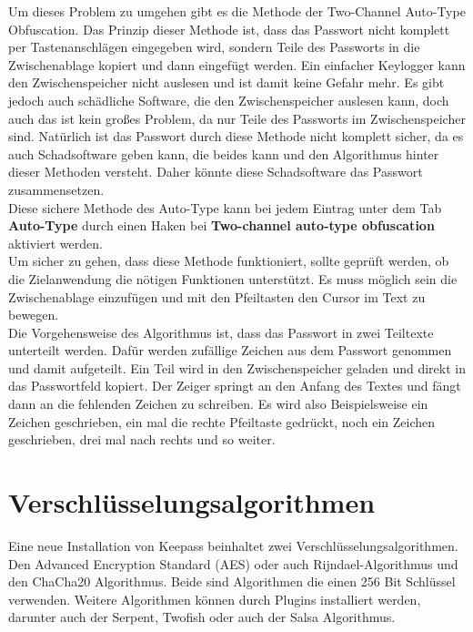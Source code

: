 \documentclass[12pt,a4paper]{scrreprt}
\begin{document}
\noindent Um dieses Problem zu umgehen gibt es die Methode der Two-Channel Auto-Type Obfuscation. Das Prinzip dieser Methode ist, dass das Passwort nicht komplett per Tastenanschlägen eingegeben wird, sondern Teile des Passworts in die Zwischenablage kopiert und dann eingefügt werden. Ein einfacher Keylogger kann den Zwischenspeicher nicht auslesen und ist damit keine Gefahr mehr. Es gibt jedoch auch schädliche Software, die den Zwischenspeicher auslesen kann, doch auch das ist kein großes Problem, da nur Teile des Passworts im Zwischenspeicher sind. Natürlich ist das Passwort durch diese Methode nicht komplett sicher, da es auch Schadsoftware geben kann, die beides kann und den Algorithmus hinter dieser Methoden versteht. Daher könnte diese Schadsoftware das Passwort zusammensetzen.\\

\noindent Diese sichere Methode des Auto-Type kann bei jedem Eintrag unter dem Tab \textbf{Auto-Type} durch einen Haken bei \textbf{Two-channel auto-type obfuscation} aktiviert werden.\\

\noindent Um sicher zu gehen, dass diese Methode funktioniert, sollte geprüft werden, ob die Zielanwendung die nötigen Funktionen unterstützt. Es muss möglich sein die Zwischenablage einzufügen und mit den Pfeiltasten den Cursor im Text zu bewegen.\\

\noindent Die Vorgehensweise des Algorithmus ist, dass das Passwort in zwei Teiltexte unterteilt werden. Dafür werden zufällige Zeichen aus dem Passwort genommen und damit aufgeteilt. Ein Teil wird in den Zwischenspeicher geladen und direkt in das Passwortfeld kopiert. Der Zeiger springt an den Anfang des Textes und fängt dann an die fehlenden Zeichen zu schreiben. Es wird also Beispielsweise ein Zeichen geschrieben, ein mal die rechte Pfeiltaste gedrückt, noch ein Zeichen geschrieben, drei mal nach rechts und so weiter.

\section{Verschlüsselungsalgorithmen}
Eine neue Installation von Keepass beinhaltet zwei Verschlüsselungsalgorithmen. Den Advanced Encryption Standard (AES) oder auch Rijndael-Algorithmus und den ChaCha20 Algorithmus. Beide sind Algorithmen die einen 256 Bit Schlüssel verwenden. Weitere Algorithmen können durch Plugins installiert werden, darunter auch der Serpent, Twofish oder auch der Salsa Algorithmus.
\end{document}
